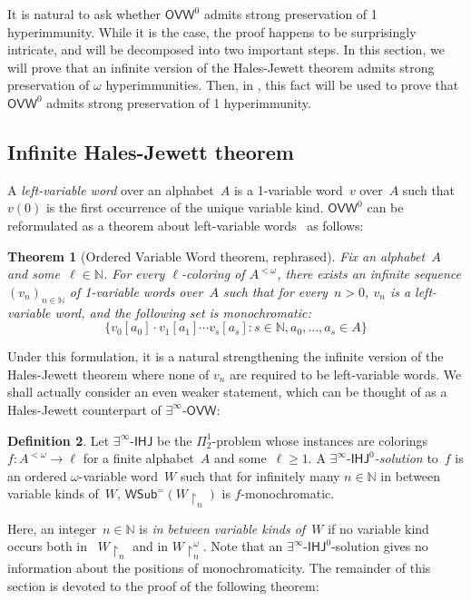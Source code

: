 \documentclass{article}
\newcommand{\uh}{\upharpoonright}
\newcommand{\OVW}[0]{\mathsf{OVW}}
\newcommand{\IOOVW}[0]{\exists^\infty\mbox{-}\mathsf{OVW}}
\newcommand{\IOIHJ}[0]{\exists^\infty\mbox{-}\mathsf{IHJ}}
\newcommand{\NN}[0]{\mathbb{N}}
\newcommand{\WSub}{\mathsf{WSub}}
\newtheorem{theorem}{Theorem}
\numberwithin{theorem}{section}
\theoremstyle{definition}
\newtheorem{definition}[theorem]{Definition}
\begin{document}
It is natural to ask whether $\OVW^0$ admits strong preservation of 1 hyperimmunity. While it is the case, the proof happens to be surprisingly intricate, and will be decomposed into two important steps. In this section, we will prove that an infinite version of the Hales-Jewett theorem admits strong preservation of $\omega$ hyperimmunities. Then, in , this fact will be used to prove that $\OVW^0$ admits strong preservation of 1 hyperimmunity.

\subsection{Infinite Hales-Jewett theorem}

A \emph{left-variable word} over an alphabet~$A$ is a 1-variable word~$v$ over~$A$ such that $v(0)$ is the first occurrence of the unique variable kind. $\OVW^0$ can be reformulated as a theorem about left-variable words~\cite{hindman2004partition} as follows:

\begin{theorem}[Ordered Variable Word theorem, rephrased]
Fix an alphabet~$A$ and some~$\ell \in \NN$. For every $\ell$-coloring of $A^{<\omega}$, there exists an infinite sequence $(v_n)_{n \in \NN}$ of 1-variable words over~$A$ such that for every~$n > 0$, $v_n$ is a left-variable word,
and the following set is monochromatic:
$$\{ v_0[a_0] \cdot v_1[a_1] \cdots v_s[a_s] : s \in \NN, a_0, \dots, a_s \in A \}
$$
\end{theorem}

Under this formulation, it is a natural strengthening the infinite version of the Hales-Jewett theorem where none of $v_n$ are required to be left-variable words. We shall actually consider an even weaker statement, which can be thought of as a Hales-Jewett counterpart of $\IOOVW$:

\begin{definition}
Let $\IOIHJ$ be the $\Pi^1_2$-problem whose instances are colorings $f : A^{<\omega} \to \ell$ for a finite alphabet~$A$ and some~$\ell \geq 1$. A \emph{$\IOIHJ^0$-solution} to~$f$ is an ordered $\omega$-variable word~$W$ such that for infinitely many $n\in\NN$ in between variable kinds of~$W$, $\WSub^{=}(W \uh_n)$ is $f$-monochromatic.
\end{definition}

Here, an integer~$n \in \NN$ is \emph{in between variable kinds of~$W$} if no variable kind occurs both in ~$W \uh_n$ and in $W \uh_n^\omega$. Note that an $\IOIHJ^0$-solution gives no information about the positions of monochromaticity.
The remainder of this section is devoted to the proof of the following theorem:
\end{document}
